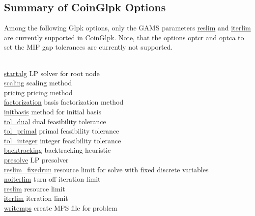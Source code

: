 \subsection{Summary of CoinGlpk Options}

Among the following Glpk options, only the GAMS parameters \hyperlink{glpkreslim}{reslim} and \hyperlink{glpkiterlim}{iterlim} are currently supported in CoinGlpk.
Note, that the options optcr and optca to set the MIP gap tolerances are currently not supported.

\begin{tabbing}
\hspace {1.0in} \= \\
\hyperlink{glpkstartalg}
{startalg} \> LP solver for root node \\
\hyperlink{glpkscaling}
{scaling} \> scaling method \\
\hyperlink{pricing}
{pricing} \> pricing method \\
\hyperlink{factorization}
{factorization} \> basis factorization method \\
\hyperlink{initbasis}
{initbasis} \> method for initial basis \\
\hyperlink{glpktol_dual}
{tol\_dual} \> dual feasibility tolerance \\
\hyperlink{glpktol_primal}
{tol\_primal} \> primal feasibility tolerance \\
\hyperlink{glpktol_integer}
{tol\_integer} \> integer feasibility tolerance \\
\hyperlink{backtracking}
{backtracking} \> backtracking heuristic \\
\hyperlink{glpkpresolve}
{presolve} \> LP presolver \\
\hyperlink{reslim_fixedrun}
{reslim\_fixedrun} \> resource limit for solve with fixed discrete variables \\
\hyperlink{noiterlim}
{noiterlim} \> turn off iteration limit \\
\hyperlink{glpkreslim}
{reslim} \> resource limit \\
\hyperlink{glpkiterlim}
{iterlim} \> iteration limit \\
\hyperlink{glpkwritemps}
{writemps} \> create MPS file for problem \\
\end{tabbing}

